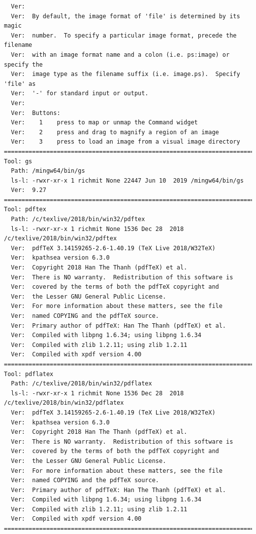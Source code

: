 \documentclass[11pt]{article}
\begin{document}
\begin{verbatim}
  Ver:  
  Ver:  By default, the image format of 'file' is determined by its magic
  Ver:  number.  To specify a particular image format, precede the filename
  Ver:  with an image format name and a colon (i.e. ps:image) or specify the
  Ver:  image type as the filename suffix (i.e. image.ps).  Specify 'file' as
  Ver:  '-' for standard input or output.
  Ver:  
  Ver:  Buttons: 
  Ver:    1    press to map or unmap the Command widget
  Ver:    2    press and drag to magnify a region of an image
  Ver:    3    press to load an image from a visual image directory
==========================================================================================
Tool: gs
  Path: /mingw64/bin/gs
  ls-l: -rwxr-xr-x 1 richmit None 22447 Jun 10  2019 /mingw64/bin/gs
  Ver:  9.27
==========================================================================================
Tool: pdftex
  Path: /c/texlive/2018/bin/win32/pdftex
  ls-l: -rwxr-xr-x 1 richmit None 1536 Dec 28  2018 /c/texlive/2018/bin/win32/pdftex
  Ver:  pdfTeX 3.14159265-2.6-1.40.19 (TeX Live 2018/W32TeX)
  Ver:  kpathsea version 6.3.0
  Ver:  Copyright 2018 Han The Thanh (pdfTeX) et al.
  Ver:  There is NO warranty.  Redistribution of this software is
  Ver:  covered by the terms of both the pdfTeX copyright and
  Ver:  the Lesser GNU General Public License.
  Ver:  For more information about these matters, see the file
  Ver:  named COPYING and the pdfTeX source.
  Ver:  Primary author of pdfTeX: Han The Thanh (pdfTeX) et al.
  Ver:  Compiled with libpng 1.6.34; using libpng 1.6.34
  Ver:  Compiled with zlib 1.2.11; using zlib 1.2.11
  Ver:  Compiled with xpdf version 4.00
==========================================================================================
Tool: pdflatex
  Path: /c/texlive/2018/bin/win32/pdflatex
  ls-l: -rwxr-xr-x 1 richmit None 1536 Dec 28  2018 /c/texlive/2018/bin/win32/pdflatex
  Ver:  pdfTeX 3.14159265-2.6-1.40.19 (TeX Live 2018/W32TeX)
  Ver:  kpathsea version 6.3.0
  Ver:  Copyright 2018 Han The Thanh (pdfTeX) et al.
  Ver:  There is NO warranty.  Redistribution of this software is
  Ver:  covered by the terms of both the pdfTeX copyright and
  Ver:  the Lesser GNU General Public License.
  Ver:  For more information about these matters, see the file
  Ver:  named COPYING and the pdfTeX source.
  Ver:  Primary author of pdfTeX: Han The Thanh (pdfTeX) et al.
  Ver:  Compiled with libpng 1.6.34; using libpng 1.6.34
  Ver:  Compiled with zlib 1.2.11; using zlib 1.2.11
  Ver:  Compiled with xpdf version 4.00
==========================================================================================

\end{verbatim}
\end{document}
